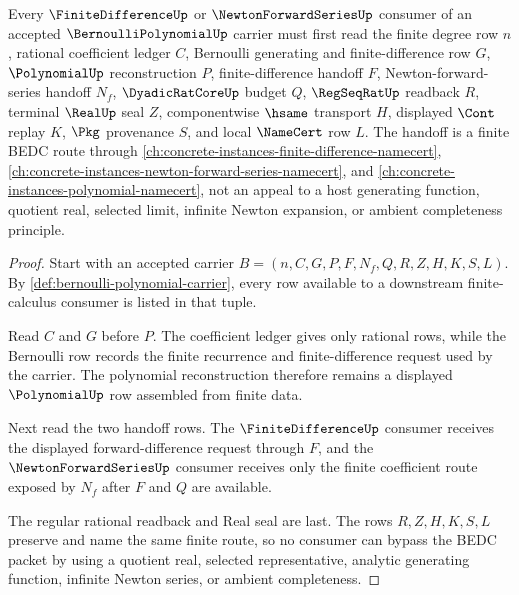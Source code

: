 \begin{theorem}
\label{thm:bernoulli-polynomial-finite-difference-handoff}
Every $\FiniteDifferenceUp$ or $\NewtonForwardSeriesUp$ consumer of an accepted $\BernoulliPolynomialUp$ carrier must first read the finite degree row $n$, rational coefficient ledger $C$, Bernoulli generating and finite-difference row $G$, $\PolynomialUp$ reconstruction $P$, finite-difference handoff $F$, Newton-forward-series handoff $N_f$, $\DyadicRatCoreUp$ budget $Q$, $\RegSeqRatUp$ readback $R$, terminal $\RealUp$ seal $Z$, componentwise $\hsame$ transport $H$, displayed $\Cont$ replay $K$, $\Pkg$ provenance $S$, and local $\NameCert$ row $L$. The handoff is a finite BEDC route through \autoref{ch:concrete-instances-finite-difference-namecert}, \autoref{ch:concrete-instances-newton-forward-series-namecert}, and \autoref{ch:concrete-instances-polynomial-namecert}, not an appeal to a host generating function, quotient real, selected limit, infinite Newton expansion, or ambient completeness principle.
\end{theorem}
\begin{proof}
Start with an accepted carrier $B=(n,C,G,P,F,N_f,Q,R,Z,H,K,S,L)$. By \autoref{def:bernoulli-polynomial-carrier}, every row available to a downstream finite-calculus consumer is listed in that tuple.

Read $C$ and $G$ before $P$. The coefficient ledger gives only rational rows, while the Bernoulli row records the finite recurrence and finite-difference request used by the carrier. The polynomial reconstruction therefore remains a displayed $\PolynomialUp$ row assembled from finite data.

Next read the two handoff rows. The $\FiniteDifferenceUp$ consumer receives the displayed forward-difference request through $F$, and the $\NewtonForwardSeriesUp$ consumer receives only the finite coefficient route exposed by $N_f$ after $F$ and $Q$ are available.

The regular rational readback and Real seal are last. The rows $R,Z,H,K,S,L$ preserve and name the same finite route, so no consumer can bypass the BEDC packet by using a quotient real, selected representative, analytic generating function, infinite Newton series, or ambient completeness.
\end{proof}


